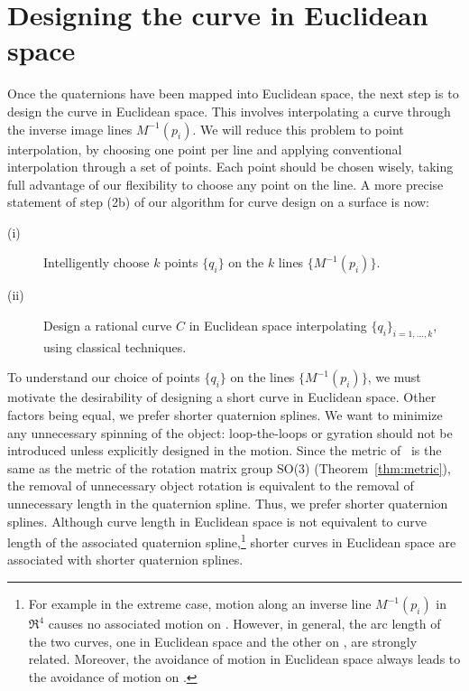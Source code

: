 
\section{Designing the curve in Euclidean space}
\label{sec:eucdesign}

Once the quaternions have been mapped into Euclidean space,
the next step is to design the curve in Euclidean space.
This involves interpolating a curve through the 
inverse image lines $M^{-1}(p_i)$.
We will reduce this problem to point interpolation, 
by choosing one point per line
and applying conventional interpolation through a set of points.
Each point should be chosen wisely, taking full advantage of our
flexibility to choose any point on the line.
A more precise statement of step (2b) of our algorithm
for curve design on a surface is now:
%
\begin{description}
\item[(i)] 
	Intelligently choose $k$ points
	$\{q_i\}$ on the $k$ lines $\{M^{-1}(p_i)\}$.
\item[(ii)]
	Design a rational curve $C$ in Euclidean space
	interpolating $\{q_i\}_{i=1,\ldots,k}$, using classical techniques.
\end{description}

To understand our choice of points $\{q_i\}$ on the lines
$\{M^{-1}(p_i)\}$, we must motivate the desirability of designing
a short curve in Euclidean space.
Other factors being equal, we prefer shorter quaternion splines.
We want to minimize any unnecessary spinning of the object:
loop-the-loops or gyration should not be introduced 
unless explicitly designed in the motion.
Since the metric of \ is the same as the metric of the rotation
matrix group SO(3) (Theorem~\ref{thm:metric}), 
the removal of unnecessary object rotation is equivalent to the
removal of unnecessary length in the quaternion spline.
Thus, we prefer shorter quaternion splines.
Although curve length in Euclidean space is not
equivalent to curve length of the associated quaternion 
spline,\footnote{For example in the extreme case, motion along
	an inverse line $M^{-1}(p_i)$ in $\Re^4$ causes no associated
	motion on .  However, in general, the arc length
	of the two curves, one in Euclidean space and the other on ,
	are strongly related.
	Moreover, the avoidance of motion in Euclidean space always leads 
	to the avoidance of motion on .}
shorter curves in Euclidean space are associated with shorter
quaternion splines.

